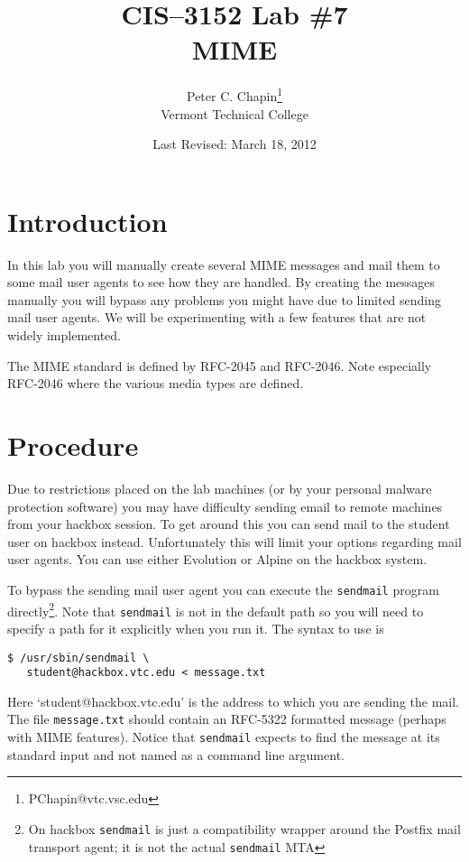 \documentclass[twocolumn]{article}
\begin{document}
\title{CIS--3152 Lab \#7\\MIME}
\author{Peter C. Chapin\thanks{PChapin@vtc.vsc.edu}\\
  Vermont Technical College}
\date{Last Revised: March 18, 2012}
\maketitle

\section*{Introduction}

In this lab you will manually create several MIME messages and mail them to some mail user
agents to see how they are handled. By creating the messages manually you will bypass any
problems you might have due to limited sending mail user agents. We will be experimenting with a
few features that are not widely implemented.

The MIME standard is defined by RFC-2045 and RFC-2046. Note especially RFC-2046 where the
various media types are defined.

\section{Procedure}

Due to restrictions placed on the lab machines (or by your personal malware protection software)
you may have difficulty sending email to remote machines from your hackbox session. To get
around this you can send mail to the student user on hackbox instead. Unfortunately this will
limit your options regarding mail user agents. You can use either Evolution or Alpine on the
hackbox system.

To bypass the sending mail user agent you can execute the \texttt{sendmail} program
directly\footnote{On hackbox \texttt{sendmail} is just a compatibility wrapper around the
  Postfix mail transport agent; it is not the actual \texttt{sendmail} MTA}. Note that
\texttt{sendmail} is not in the default path so you will need to specify a path for it
explicitly when you run it. The syntax to use is

\begin{verbatim}
$ /usr/sbin/sendmail \
   student@hackbox.vtc.edu < message.txt
\end{verbatim}

Here `student@hackbox.vtc.edu' is the address to which you are sending the mail. The file
\texttt{message.txt} should contain an RFC-5322 formatted message (perhaps with MIME features).
Notice that \texttt{sendmail} expects to find the message at its standard input and not named as
a command line argument.
\end{document}
